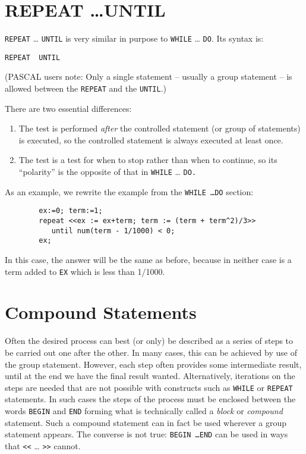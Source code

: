 \section{REPEAT \ldots UNTIL}
\hypertarget{command:REPEAT}{}
\hypertarget{reserved:UNTIL}{}

 \texttt{REPEAT} \ldots{} \texttt{UNTIL} is very similar
in purpose to \texttt{WHILE} \ldots{} \texttt{DO}.  Its syntax is:
\begin{syntax}
        \texttt{REPEAT }\texttt{ UNTIL }
\end{syntax}
(PASCAL users note: Only a single statement -- usually a group statement
-- is allowed between the \texttt{REPEAT} and the \texttt{UNTIL}.)

There are two essential differences:
\begin{enumerate}
\item The test is performed \emph{after} the controlled statement (or group of
statements) is executed, so the controlled statement is always executed at
least once.

\item The test is a test for when to stop rather than when to continue, so its
``polarity'' is the opposite of that in \texttt{WHILE} \ldots{} \texttt{DO.}
\end{enumerate}

As an example, we rewrite the example from the \texttt{WHILE \ldots DO} section:
\begin{samepage}
\begin{verbatim}
        ex:=0; term:=1;
        repeat <<ex := ex+term; term := (term + term^2)/3>>
           until num(term - 1/1000) < 0;
        ex;
\end{verbatim}
\end{samepage}
In this case, the answer will be the same as before, because in neither
case is a term added to \texttt{EX} which is less than 1/1000.

\section{Compound Statements}
\hypertarget{command:BEGIN}{}

Often the desired process can best (or only) be
described as a series of steps to be carried out one after the other.  In
many cases, this can be achieved by use of the group statement.  However, each step often provides some intermediate
result, until at the end we have the final result wanted.  Alternatively,
iterations on the steps are needed that are not possible with constructs
such as \texttt{WHILE} or \texttt{REPEAT}
statements.  In such cases the steps of the process must be
enclosed between the words \texttt{BEGIN} and \texttt{END} forming what is technically called a \emph{block} or
\emph{compound} statement.  Such a compound statement can in fact be used
wherever a group statement appears.  The converse is not true: {\tt BEGIN
\ldots END} can be used in ways 
that \texttt{<}\texttt{<} \ldots{} \texttt{>}\texttt{>} cannot.

